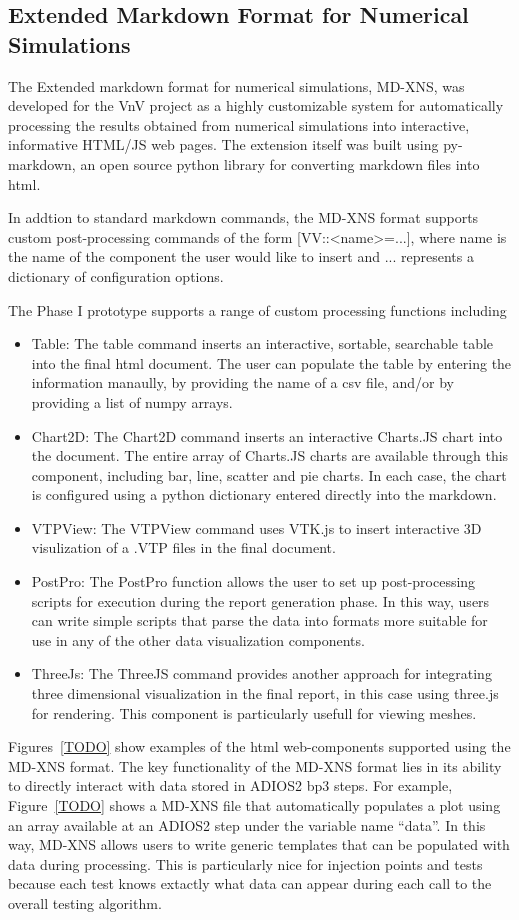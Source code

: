 \subsection{Extended Markdown Format for Numerical Simulations} 

The Extended markdown format for numerical simulations, MD-XNS,  was developed for the VnV project as a highly customizable system for automatically processing 
the results obtained from numerical simulations into interactive, informative HTML/JS web pages. The extension itself was built using py-markdown, an open source 
python library for converting markdown files into html.

In addtion to standard markdown commands, the MD-XNS format supports custom post-processing commands of the form [VV::<name>={...}], where name is the name of 
the component the user would like to insert and {...} represents a dictionary of configuration options. 

The Phase I prototype supports a range of custom processing functions including 
\begin{itemize}
\item Table: The table command inserts an interactive, sortable, searchable table into the final html document. The user can populate the table by entering the information
manaully, by providing the name of a csv file, and/or by providing a list of numpy arrays. 
\item Chart2D: The Chart2D command inserts an interactive Charts.JS chart into the document. The entire array of Charts.JS charts are available through this component, including bar, 
line, scatter and pie charts. In each case, the chart is configured using a python dictionary entered directly into the markdown. 
\item VTPView: The VTPView command uses VTK.js to insert interactive 3D visulization of a .VTP files in the final document. 
\item PostPro: The PostPro function allows the user to set up post-processing scripts for execution during the report generation phase. In this way,
users can write simple scripts that parse the data into formats more suitable for use in any of the other data visualization components. 
\item ThreeJs: The ThreeJS command provides another approach for integrating three dimensional visualization in the final report, in this case using three.js for rendering. This 
component is particularly usefull for viewing meshes. 
\end{itemize}
Figures~\ref{TODO} show examples of the html web-components supported using the MD-XNS format. The key functionality of the MD-XNS format lies in its ability to directly interact with data stored in ADIOS2 bp3 steps. For example, Figure~\ref{TODO} shows a MD-XNS file that automatically populates a plot using an array available at an ADIOS2 step under the variable name ``data''. In this way, MD-XNS allows users to write generic templates that can be populated with data during processing. This is particularly nice for \VV injection points and \VV tests because each test knows extactly what data can appear during each call to the overall testing algorithm. 


